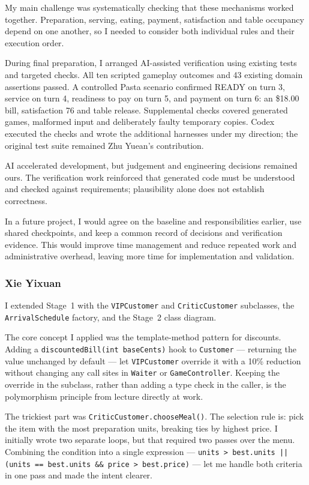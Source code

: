 My main challenge was systematically checking that these mechanisms worked together. Preparation,
serving, eating, payment, satisfaction and table occupancy depend on one another, so I needed to
consider both individual rules and their execution order.

During final preparation, I arranged AI-assisted verification using existing tests and targeted
checks. All ten scripted gameplay outcomes and 43 existing domain assertions passed. A controlled
Pasta scenario confirmed READY on turn 3, service on turn 4, readiness to pay on turn 5, and payment
on turn 6: an \$18.00 bill, satisfaction 76 and table release. Supplemental checks covered generated
games, malformed input and deliberately faulty temporary copies. Codex executed the checks and wrote
the additional harnesses under my direction; the original test suite remained Zhu Yuean's
contribution.

AI accelerated development, but judgement and engineering decisions remained ours. The verification
work reinforced that generated code must be understood and checked against requirements;
plausibility alone does not establish correctness.

In a future project, I would agree on the baseline and responsibilities earlier, use shared
checkpoints, and keep a common record of decisions and verification evidence. This would improve
time management and reduce repeated work and administrative overhead, leaving more time for
implementation and validation.

\subsubsection*{Xie Yixuan}
I extended Stage~1 with the \texttt{VIPCustomer} and \texttt{CriticCustomer}
subclasses, the \texttt{ArrivalSchedule} factory, and the Stage~2 class diagram.

The core concept I applied was the template-method pattern for discounts.
Adding a \texttt{discountedBill(int baseCents)} hook to \texttt{Customer} ---
returning the value unchanged by default --- let \texttt{VIPCustomer} override
it with a 10\% reduction without changing any call sites in \texttt{Waiter} or
\texttt{GameController}.
Keeping the override in the subclass, rather than adding a type check in the
caller, is the polymorphism principle from lecture directly at work.

The trickiest part was \texttt{CriticCustomer.chooseMeal()}.
The selection rule is: pick the item with the most preparation units, breaking
ties by highest price.
I initially wrote two separate loops, but that required two passes over the menu.
Combining the condition into a single expression ---
\texttt{units~>~best.units || (units == best.units \&\& price~>~best.price)} ---
let me handle both criteria in one pass and made the intent clearer.

